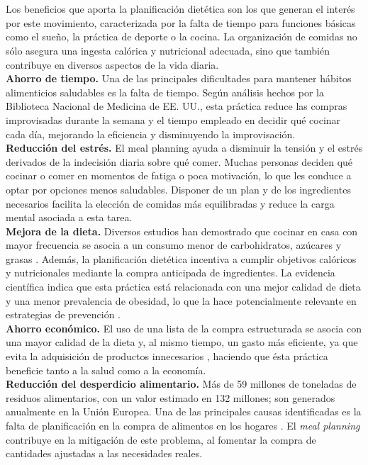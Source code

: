 \documentclass[twoside, openright, 11pt]{report}
\begin{document}
		\\\\
		Los beneficios que aporta la planificación dietética son los que generan el interés por este movimiento, caracterizada por la falta de tiempo para funciones básicas como el sueño, la práctica de deporte o la cocina. La organización de comidas no sólo asegura una ingesta calórica y nutricional adecuada, sino que también contribuye en diversos aspectos de la vida diaria.\\
		\textbf{Ahorro de tiempo.} Una de las principales dificultades para mantener hábitos alimenticios saludables es la falta de tiempo. Según análisis hechos por la Biblioteca Nacional de Medicina de EE. UU., esta práctica reduce las compras improvisadas durante la semana y el tiempo empleado en decidir qué cocinar cada día, mejorando la eficiencia y disminuyendo la improvisación.
		\\
		\textbf{Reducción del estrés.} El meal planning ayuda a disminuir la tensión y el estrés derivados de la indecisión diaria sobre qué comer. Muchas personas deciden qué cocinar o comer en momentos de fatiga o poca motivación, lo que les conduce a optar por opciones menos saludables. Disponer de un plan y de los ingredientes necesarios facilita la elección de comidas más equilibradas y reduce la carga mental asociada a esta tarea.
		\\
		\textbf{Mejora de la dieta.} Diversos estudios han demostrado que cocinar en casa con mayor frecuencia se asocia a un consumo menor de carbohidratos, azúcares y grasas \cite{johnshopkins2014}. Además, la planificación dietética incentiva a cumplir objetivos calóricos y nutricionales mediante la compra anticipada de ingredientes. La evidencia científica indica que esta práctica está relacionada con una mejor calidad de dieta y una menor prevalencia de obesidad, lo que la hace potencialmente relevante en estrategias de prevención \cite{ducrot2017}.
		\\
		\textbf{Ahorro económico.} El uso de una lista de la compra estructurada se asocia con una mayor calidad de la dieta y, al mismo tiempo, un gasto más eficiente, ya que evita la adquisición de productos innecesarios \cite{jneb2017}, haciendo que ésta práctica beneficie tanto a la salud como a la economía.
		\\
		\textbf{Reducción del desperdicio alimentario.} Más de 59 millones de toneladas de residuos alimentarios, con un valor estimado en 132 millones; son generados anualmente en la Unión Europea. Una de las principales causas identificadas es la falta de planificación en la compra de alimentos en los hogares \cite{europeancommission2020}. El \textit{meal planning} contribuye en la mitigación de este problema, al fomentar la compra de cantidades ajustadas a las necesidades reales.
	
\end{document}
